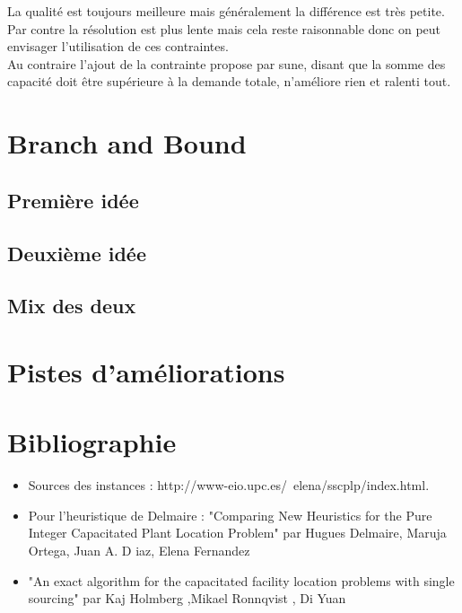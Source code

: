 \documentclass[12pt,a4paper]{article}
\begin{document}
La qualité est toujours meilleure mais généralement la différence est très petite. Par contre la résolution est plus lente mais cela reste raisonnable donc on peut envisager l'utilisation de ces contraintes.\\

Au contraire l'ajout de la contrainte propose par sune, disant que la somme des capacité doit être supérieure à la demande totale, n’améliore rien et ralenti tout.

\section{Branch and Bound}

\subsection{Première idée}

\subsection{Deuxième idée}

\subsection{Mix des deux}

\section{Pistes d'améliorations}

\section*{Bibliographie}

\begin{itemize}
\item
Sources des instances : http://www-eio.upc.es/~elena/sscplp/index.html.\\
\item
Pour l'heuristique de Delmaire : "Comparing New Heuristics for the Pure Integer Capacitated Plant Location Problem" par Hugues Delmaire, Maruja Ortega, Juan A. D iaz, Elena Fernandez 
\item
"An exact algorithm for the capacitated facility location problems with single sourcing" par Kaj Holmberg ,Mikael Ronnqvist , Di Yuan
\end{itemize}
\end{document}
